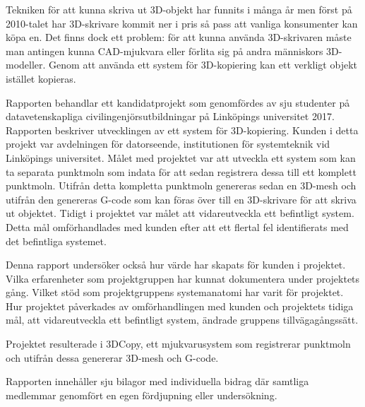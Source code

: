 Tekniken för att kunna skriva ut 3D-objekt har funnits i många år men först på 2010-talet har 3D-skrivare kommit ner i pris så pass att vanliga konsumenter kan köpa en.  Det finns dock ett problem: för att kunna använda 3D-skrivaren måste man antingen kunna CAD-mjukvara eller förlita sig på andra människors 3D-modeller. Genom att använda ett system för 3D-kopiering kan ett verkligt objekt istället kopieras.

Rapporten behandlar ett kandidatprojekt som genomfördes av sju studenter på datavetenskapliga civilingenjörsutbildningar på Linköpings universitet 2017. Rapporten beskriver utvecklingen av ett system för 3D-kopiering. Kunden i detta projekt var avdelningen för datorseende, institutionen för systemteknik vid Linköpings universitet. Målet med projektet var att utveckla ett system som kan ta separata punktmoln som indata för att sedan registrera dessa till ett komplett punktmoln. Utifrån detta kompletta punktmoln genereras sedan en 3D-mesh och utifrån den genereras G-code som kan föras över till en 3D-skrivare för att skriva ut objektet.
Tidigt i projektet var målet att vidareutveckla ett befintligt system. Detta mål omförhandlades med kunden efter att ett flertal fel identifierats med det befintliga systemet. 

Denna rapport undersöker också hur värde har skapats för kunden i projektet. Vilka erfarenheter som projektgruppen har kunnat dokumentera under projektets gång. Vilket stöd som projektgruppens systemanatomi har varit för projektet. Hur projektet påverkades av omförhandlingen med kunden och projektets tidiga mål, att vidareutveckla ett befintligt system, ändrade gruppens tillvägagångssätt.  

Projektet resulterade i 3DCopy, ett mjukvarusystem som registrerar punktmoln och utifrån dessa genererar 3D-mesh och G-code.

Rapporten innehåller sju bilagor med individuella bidrag där samtliga medlemmar genomfört en egen fördjupning eller undersökning. 

